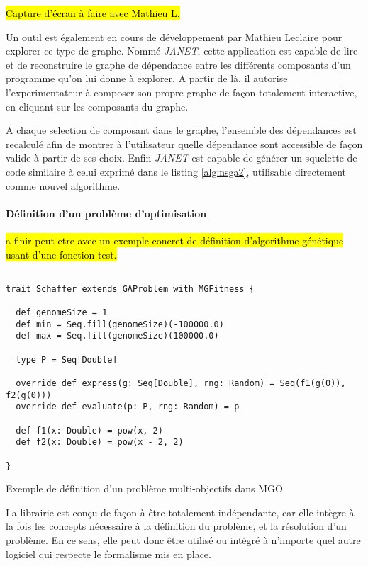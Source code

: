 \hl{Capture d'écran à faire avec Mathieu L.}


Un outil est également en cours de développement par Mathieu Leclaire pour explorer ce type de graphe. Nommé \textit{JANET}, cette application est capable de lire et de reconstruire le graphe de dépendance entre les différents composants d'un programme qu'on lui donne à explorer. A partir de là, il autorise l'experimentateur à composer son propre graphe de façon totalement interactive, en cliquant sur les composants du graphe.

A chaque selection de composant dans le graphe, l'ensemble des dépendances est recalculé afin de montrer à l'utilisateur quelle dépendance sont accessible de façon valide à partir de ses choix. Enfin \textit{JANET} est capable de générer un squelette de code similaire à celui exprimé dans le listing \ref{alg:nsga2}, utilisable directement comme nouvel algorithme.

\paragraph{Définition d'un problème d'optimisation}

\hl{a finir peut etre avec un exemple concret de définition d'algorithme génétique usant d'une fonction test.}

\begin{listing}[H]

\begin{verbatim}

trait Schaffer extends GAProblem with MGFitness {

  def genomeSize = 1
  def min = Seq.fill(genomeSize)(-100000.0)
  def max = Seq.fill(genomeSize)(100000.0)

  type P = Seq[Double]

  override def express(g: Seq[Double], rng: Random) = Seq(f1(g(0)), f2(g(0)))
  override def evaluate(p: P, rng: Random) = p

  def f1(x: Double) = pow(x, 2)
  def f2(x: Double) = pow(x - 2, 2)

}

\end{verbatim}
\caption{Exemple de définition d'un problème multi-objectifs dans MGO}
\label{alg:Schaffer}
\end{listing}

La librairie est conçu de façon à être totalement indépendante, car elle intègre à la fois les concepts nécessaire à la définition du problème, et la résolution d'un problème. En ce sens, elle peut donc être utilisé ou intégré à n'importe quel autre logiciel qui respecte le formalisme mis en place.

